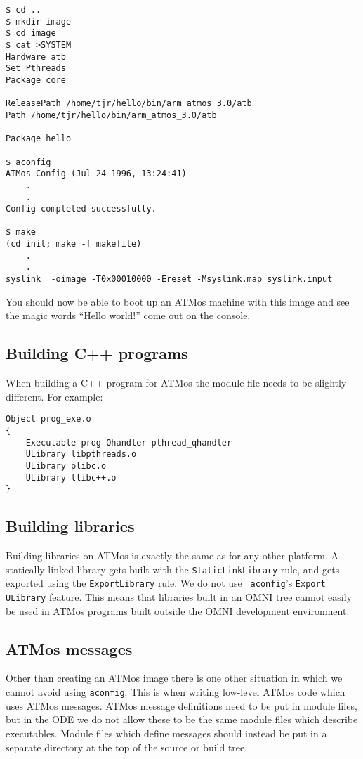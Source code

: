 \documentclass[11pt,twoside,onecolumn]{article}
\begin{document}
{\footnotesize \begin{verbatim}
$ cd ..
$ mkdir image
$ cd image
$ cat >SYSTEM
Hardware atb
Set Pthreads
Package core

ReleasePath /home/tjr/hello/bin/arm_atmos_3.0/atb
Path /home/tjr/hello/bin/arm_atmos_3.0/atb

Package hello

$ aconfig
ATMos Config (Jul 24 1996, 13:24:41)
    .
    .
Config completed successfully.

$ make
(cd init; make -f makefile)
    .
    .
syslink  -oimage -T0x00010000 -Ereset -Msyslink.map syslink.input

\end{verbatim}}

You should now be able to boot up an ATMos machine with this image and see the
magic words ``Hello world!'' come out on the console.

\subsection{Building C++ programs}

When building a C++ program for ATMos the module file needs to be slightly
different.  For example:

{\footnotesize \begin{verbatim}
Object prog_exe.o
{
    Executable prog Qhandler pthread_qhandler
    ULibrary libpthreads.o
    ULibrary plibc.o
    ULibrary llibc++.o
}
\end{verbatim}}

\subsection{Building libraries}

Building libraries on ATMos is exactly the same as for any other platform.  A
statically-linked library gets built with the \verb|StaticLinkLibrary| rule,
and gets exported using the \verb|ExportLibrary| rule.  We do not use {\tt
aconfig}'s {\tt Export ULibrary} feature.  This means that libraries built in
an OMNI tree cannot easily be used in ATMos programs built outside the OMNI
development environment.

\subsection{ATMos messages}
\label{atmosmessages}

Other than creating an ATMos image there is one other situation in which we
cannot avoid using {\tt aconfig}.  This is when writing low-level ATMos code
which uses ATMos messages.  ATMos message definitions need to be put in module
files, but in the ODE we do not allow these to be the same module files which
describe executables.  Module files which define messages should instead be put
in a separate directory at the top of the source or build tree.
\end{document}
